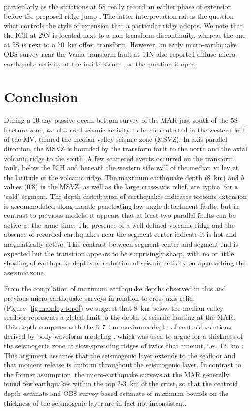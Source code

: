\documentclass[jgr]{agu2001}
\newlength{\tw}
\begin{document}
\begin{article}
particularly as the striations at 5\dg S really record an earlier
phase of extension before the proposed ridge jump
\citep{reston02}. The latter interpretation  raises  the question what
controls the style of extension that a particular ridge adopts.   We
note that the
ICH at 29\dg N is located next to a non-transform discontinuity,
whereas the one at 5\dg S is next to a 70~km offset transform. However,
an early micro-earthquake OBS survey near the Vema transform fault at
11\dg N also reported diffuse micro-earthquake activity at the inside
corner \citep{rowlett84}, so the question is open.  

\section{Conclusion}

During a 10-day passive ocean-bottom survey of the  MAR just south
of the 5\dg S fracture zone, we observed seismic activity to be
concentrated in the western half of the MV, termed the median valley
seismic zone (MSVZ). In axis-parallel direction, the MSVZ is bounded
by the transform fault to the north and the axial
volcanic ridge to the south.  A few scattered events occurred on the transform
fault, below the ICH and beneath the western side wall of the median
valley at the latitude of the volcanic ridge. The maximum earthquake
depth (8~km) and $b$ values (0.8) in the MSVZ, as well as the large
cross-axis relief, are typical for a `cold' segment.  The depth
distribution of earthquakes indicates tectonic extension is
accommodated along mantle-penetrating low-angle detachment faults, but in contrast to
previous models, it appears that at least two parallel faults can be
active at the same time.  The presence of a well-defined volcanic
ridge and the absence of recorded earthquakes near the segment center
indicate it is hot and magmatically active.  This contrast between
segment center and segment end is expected but the transition appears
to be surprisingly sharp, with no or little shoaling of earthquake
depths or reduction of seismic activity on approaching the aseismic
zone. 

From the compilation of maximum earthquake depths observed in this and
previous micro-earthquake surveys in relation to cross-axis relief
(Figure~\ref{fig:maxdep-topo}) we suggest that 8~km below the median valley
seafloor represents a global limit to the depth of seismic faulting at
the MAR.  This depth compares with the 6--7~km maximum depth of centroid
solutions derived by body waveform modeling \citep{huang88}, which was
used to argue for a thickness of the seismogenic zone at
slow-spreading ridges of twice that
amount, i.e., 12~km \citep{solomon88}.  This argument assumes
that the seismogenic layer extends to the seafloor and that moment
release is uniform throughout the seismogenic layer.  In contrast to
the former assumption, the micro-earthquake surveys at the MAR
generally found few earthquakes within the top 2-3~km of the crust, so
that the centroid depth estimate and OBS survey
based estimate of maximum bounds on the thickness of the seismogenic
layer are in fact not inconsistent.


\end{article}
\end{document}
